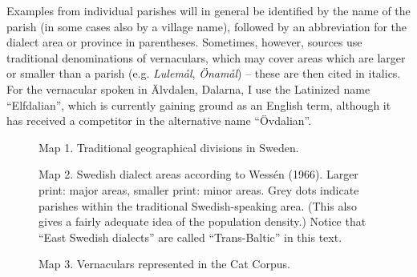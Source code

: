
Examples from individual parishes will in general be identified by the name of the parish (in some cases also by a village name), followed by an abbreviation for the dialect area or province in parentheses. Sometimes, however, sources use traditional denominations of vernaculars, which may cover areas which are larger or smaller than a parish (e.g. \textit{Lulemål}, \textit{Önamål}) – these are then cited in italics. For the vernacular spoken in Älvdalen, Dalarna, I use the Latinized name “Elfdalian”, which is currently gaining ground as an English term, although it has received a competitor in the alternative name “Övdalian”.


\begin{figure}[h]

\begin{minipage}{5.82292in}

\label{bkm:Ref264031044}Map 1. Traditional geographical divisions in Sweden.


\end{minipage}

\end{figure}

\begin{figure}[h]

\begin{minipage}{5.08403in}

Map 2. Swedish dialect areas according to Wessén (1966). Larger print: major areas, smaller print: minor areas. Grey dots indicate parishes within the traditional Swedish-speaking area. (This also gives a fairly adequate idea of the population density.) Notice that “East Swedish dialects” are called “Trans-Baltic” in this text.


\end{minipage}

\end{figure}

\begin{figure}[h]

\begin{minipage}{4.09931in}

\label{bkm:Ref264030993}Map 3. Vernaculars represented in the Cat Corpus.


\end{minipage}

\end{figure}

